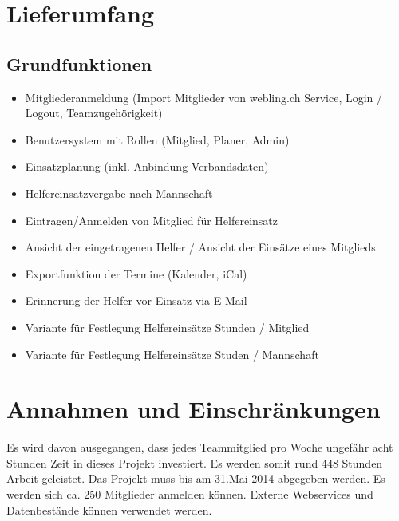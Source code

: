 \section{Lieferumfang}
\subsection{Grundfunktionen}
\begin{itemize}
    \item Mitgliederanmeldung (Import Mitglieder von webling.ch Service, Login / Logout, Teamzugehörigkeit)
    \item Benutzersystem mit Rollen (Mitglied, Planer, Admin)
    \item Einsatzplanung (inkl. Anbindung Verbandsdaten)
    \item Helfereinsatzvergabe nach Mannschaft
    \item Eintragen/Anmelden von Mitglied für Helfereinsatz
    \item Ansicht der eingetragenen Helfer / Ansicht der Einsätze eines Mitglieds
    \item Exportfunktion der Termine (Kalender, iCal)
    \item Erinnerung der Helfer vor Einsatz via E-Mail
    \item Variante für Festlegung Helfereinsätze Stunden / Mitglied
    \item Variante für Festlegung Helfereinsätze Studen  / Mannschaft
\end{itemize}

\section{Annahmen und Einschränkungen}
Es wird davon ausgegangen, dass jedes Teammitglied pro Woche ungefähr acht Stunden Zeit in dieses Projekt investiert. Es werden somit rund 448 Stunden Arbeit geleistet. Das Projekt muss bis am 31.Mai 2014 abgegeben werden. 
Es werden sich ca. 250 Mitglieder anmelden können.
Externe Webservices und Datenbestände können verwendet werden.
